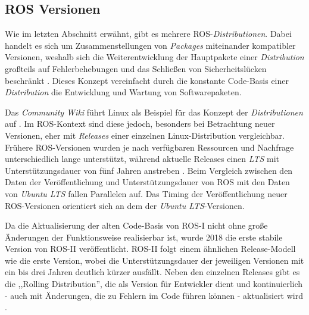 \subsection{ROS Versionen} \label{sec:Versionen_ROS}

Wie im letzten Abschnitt erwähnt, gibt es mehrere \ac{ROS}-\textit{Distributionen}. Dabei handelt es sich um Zusammenstellungen von \textit{Packages} miteinander kompatibler Versionen, weshalb sich die Weiterentwicklung der Hauptpakete einer \textit{Distribution} großteils auf Fehlerbehebungen und das Schließen von Sicherheitslücken beschränkt \cite[Absatz~2]{miura_distributions_2021}. Dieses Konzept vereinfacht durch die konstante Code-Basis einer \textit{Distribution} die Entwicklung und Wartung von Softwarepaketen.

Das \textit{Community Wiki} führt Linux als Beispiel für das Konzept der \textit{Distributionen} auf \cite[Absatz~2]{miura_distributions_2021}. Im \ac{ROS}-Kontext sind diese jedoch, besonders bei Betrachtung neuer Versionen, eher mit \textit{Releases} einer einzelnen Linux-Distribution vergleichbar. Frühere \ac{ROS}-Versionen wurden je nach verfügbaren Ressourcen und Nachfrage unterschiedlich lange unterstützt, während aktuelle Releases einen \textit{\ac{LTS}} mit Unterstützungsdauer von fünf Jahren anstreben \cite[Absatz~5]{miura_distributions_2021}. Beim Vergleich zwischen den Daten der Veröffentlichung und Unterstützungsdauer von \ac{ROS} mit den Daten von \textit{Ubuntu LTS} \cite{murray_releases_2021} fallen Parallelen auf. Das Timing der Veröffentlichung neuer \ac{ROS}-Versionen orientiert sich an dem der \textit{Ubuntu LTS}-Versionen.

Da die Aktualisierung der alten Code-Basis von \ac{ROS}-I nicht ohne große Änderungen der Funktionsweise realisierbar ist, wurde 2018 die erste stabile Version von \ac{ROS}-II veröffentlicht. \ac{ROS}-II folgt einem ähnlichen Release-Modell wie die erste Version, wobei die Unterstützungsdauer der jeweiligen Versionen mit ein bis drei Jahren deutlich kürzer ausfällt. Neben den einzelnen Releases gibt es die ,,Rolling Distribution'', die als Version für Entwickler dient und kontinuierlich - auch mit Änderungen, die zu Fehlern im Code führen können - aktualisiert wird \cite{open_robotics_distributions_2021}.

